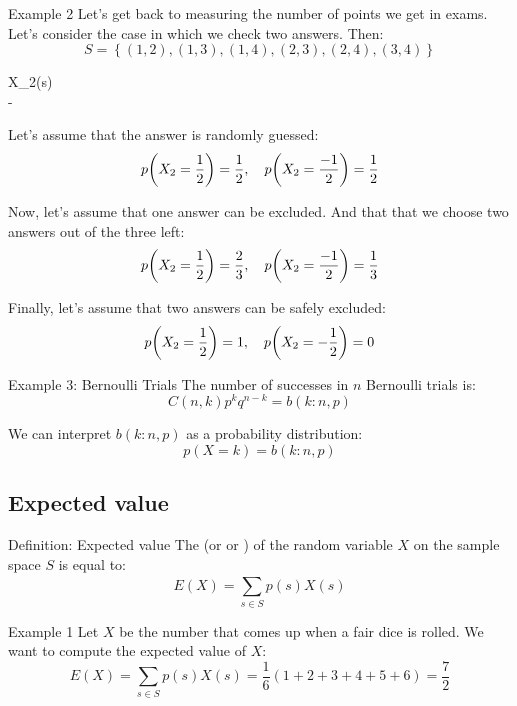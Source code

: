 \documentclass[a4paper]{article}
\begin{document}
\begin{parag}{Example 2}
    Let's get back to measuring the number of points we get in exams. Let's consider the case in which we check two answers. Then: 
    \[S = \left\{\left(1, 2\right), \left(1, 3\right), \left(1, 4\right), \left(2, 3\right), \left(2, 4\right), \left(3, 4\right)\right\}\]

    \begin{functionbypart}{X_2\left(s\right)}
       \\
    -  
    \end{functionbypart}

    Let's assume that the answer is randomly guessed: 
    \[p\left(X_2 = \frac{1}{2}\right) = \frac{1}{2}, \mathspace p\left(X_2 = \frac{-1}{2}\right) = \frac{1}{2}\]
    
    Now, let's assume that one answer can be excluded. And that that we choose two answers out of the three left: 
    \[p\left(X_2 = \frac{1}{2}\right) = \frac{2}{3}, \mathspace p\left(X_2 = \frac{-1}{2}\right) = \frac{1}{3}\]
    
    Finally, let's assume that two answers can be safely excluded: 
    \[p\left(X_2 = \frac{1}{2}\right) = 1, \mathspace p\left(X_2 = -\frac{1}{2}\right) = 0\]
\end{parag}

\begin{parag}{Example 3: Bernoulli Trials}
    The number of successes in $n$ Bernoulli trials is: 
    \[C\left(n, k\right) p^k q^{n-k} = b\left(k: n, p\right)\]

    We can interpret $b\left(k: n, p\right)$ as a probability distribution: 
    \[p\left(X = k\right) = b\left(k : n, p\right)\]
\end{parag}

\subsection{Expected value}
\begin{parag}{Definition: Expected value}
    The  (or  or ) of the random variable $X$ on the sample space $S$ is equal to: 
    \[E\left(X\right) = \sum_{s \in S}^{} p\left(s\right) X\left(s\right)\]
\end{parag}

\begin{parag}{Example 1}
    Let $X$ be the number that comes up when a fair dice is rolled. We want to compute the expected value of $X$: 
    \[E\left(X\right) = \sum_{s \in S}^{} p\left(s\right)X\left(s\right) = \frac{1}{6}\left(1 + 2 + 3 + 4 + 5 + 6\right) = \frac{7}{2}\]
\end{parag}
\end{document}
